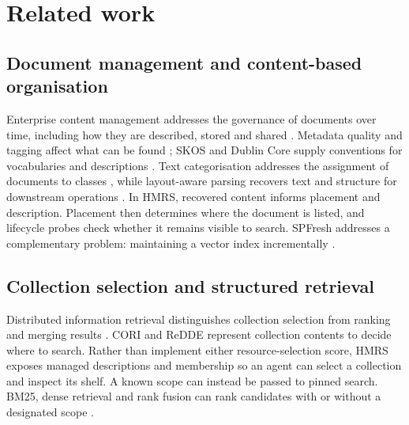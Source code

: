 \section{Related work}
\label{sec:related}

\subsection{Document management and content-based organisation}

Enterprise content management addresses the governance of documents over
time, including how they are described, stored and shared
\citep{paivarinta-ecm-2005,tyrvaainen-ecm-2006}. Metadata quality and tagging
affect what can be found \citep{park-metadata-quality-2009,golder-tagging-2006};
SKOS and Dublin Core supply conventions for vocabularies and descriptions
\citep{skos,dcmi-terms}. Text categorisation addresses the assignment of
documents to classes \citep{sebastiani2002machine}, while layout-aware parsing
recovers text and structure for downstream operations
\citep{zhong-publaynet-layout-2019,huang-layoutlmv3-docai-2022,mineru}.
In HMRS, recovered content informs placement and description. Placement
then determines where the document is listed, and lifecycle probes
check whether it remains visible to search. SPFresh addresses a
complementary problem: maintaining a vector index incrementally
\citep{xu2023spfresh}.

\subsection{Collection selection and structured retrieval}

Distributed information retrieval distinguishes collection selection from
ranking and merging results \citep{callan1995searching,si2003redde,shokouhi-federated-2011}.
CORI and ReDDE represent collection contents to decide where to search.
Rather than implement either resource-selection score, HMRS exposes managed
descriptions and membership so an agent can select a collection and inspect
its shelf. A known scope can instead be passed to pinned search. BM25, dense
retrieval and rank fusion can rank candidates with or without a designated
scope \citep{bm25,dpr,rrf-cormack,bge-m3}.

